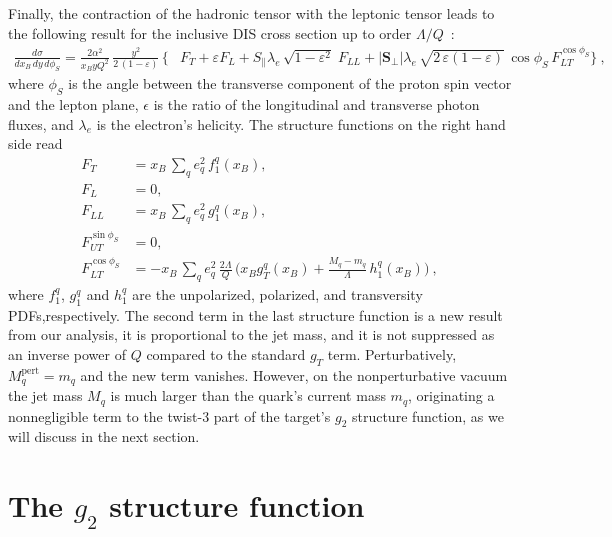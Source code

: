\documentclass[preprintnumbers,floatfix,nofootinbib]{revtex4}
\newcommand{\xbj}{{x_B}}                   %
\newcommand{\mj}{M_q}
\newcommand{\mq}{m_q}
\begin{document}
Finally, the contraction of the hadronic tensor with the leptonic tensor leads
to the following result for the inclusive DIS cross section up to order $\Lambda/Q$~\cite{Bacchetta:2006tn}:
\begin{align}
\frac{d\sigma}{d\xbj \, dy\, d\phi_S}
=
\frac{2 \alpha^2}{\xbj y Q^2}\,
\frac{y^2}{2\,(1-\varepsilon)}\, 
\biggl\{
&F_{T} + \varepsilon F_{L}
+ S_\parallel \lambda_e\,
  \sqrt{1-\varepsilon^2}\; 
F_{LL}
+ |\bm{S}_\perp| \lambda_e\, \sqrt{2\,\varepsilon (1-\varepsilon)}\, 
  \cos\phi_S\, 
F_{LT}^{\cos \phi_S}
 \biggr\} \ ,
\label{e:crossdis}
\end{align}
where $\phi_S$ is the angle between the transverse component of the proton spin vector and the lepton plane, $\epsilon$ is the ratio of the longitudinal and transverse photon fluxes, and $\lambda_e$ is the electron's helicity. 
The structure functions on the right hand side read
\begin{align}
F_{T} &= \xbj\,\sum_q e_q^2\,f_1^q(\xbj),
\\
F_{L} &= 0,
\\
F_{LL} &=\xbj\,\sum_q e_q^2\,g_1^q(\xbj),
\label{e:FLLint}
\\
F_{UT}^{\sin \phi_S}&=0,
\label{e:FUTint}
\\
F_{LT}^{\cos \phi_S}&=-\xbj\,\sum_q e_q^2\, \frac{2\Lambda}{Q}\,
\biggl(\xbj  g_T^q(\xbj)
   + \frac{\mj -\mq}{\Lambda} \, h_{1}^q(\xbj) \biggr) \ ,
\label{e:FLTint}
\end{align}
where $f_1^q$, $g_1^q$ and $h_1^q$ are the unpolarized, polarized, and transversity PDFs,respectively.
The second term in the last structure function is a new result from our
analysis, it is proportional to the jet mass, and it is not suppressed as an
inverse power of $Q$ compared to the 
standard $g_T$ term. Perturbatively, $M_q^\text{pert}=m_q$ and the new term vanishes. However, on the nonperturbative vacuum the jet mass $M_q$ is much larger than the quark's current mass $m_q$, originating a nonnegligible term to the twist-3 part of the target's $g_2$ structure function, as we will discuss in the next section.  

 

\section{The $g_2$ structure function}
\end{document}
